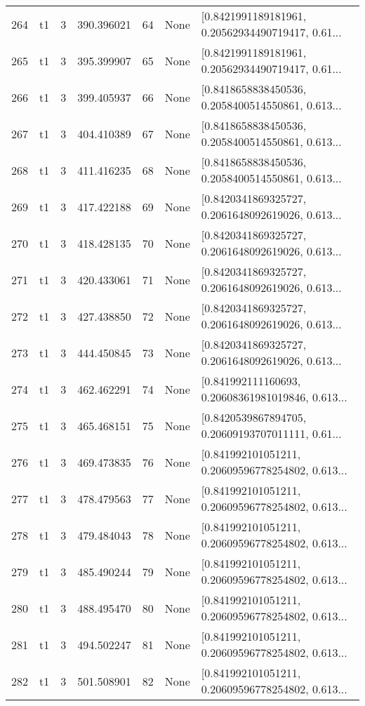 \begin{tabular}{lllrlll}
264 &  t1 &   3 &  390.396021 &   64 &  None &  [0.8421991189181961, 0.20562934490719417, 0.61... \\
265 &  t1 &   3 &  395.399907 &   65 &  None &  [0.8421991189181961, 0.20562934490719417, 0.61... \\
266 &  t1 &   3 &  399.405937 &   66 &  None &  [0.8418658838450536, 0.2058400514550861, 0.613... \\
267 &  t1 &   3 &  404.410389 &   67 &  None &  [0.8418658838450536, 0.2058400514550861, 0.613... \\
268 &  t1 &   3 &  411.416235 &   68 &  None &  [0.8418658838450536, 0.2058400514550861, 0.613... \\
269 &  t1 &   3 &  417.422188 &   69 &  None &  [0.8420341869325727, 0.2061648092619026, 0.613... \\
270 &  t1 &   3 &  418.428135 &   70 &  None &  [0.8420341869325727, 0.2061648092619026, 0.613... \\
271 &  t1 &   3 &  420.433061 &   71 &  None &  [0.8420341869325727, 0.2061648092619026, 0.613... \\
272 &  t1 &   3 &  427.438850 &   72 &  None &  [0.8420341869325727, 0.2061648092619026, 0.613... \\
273 &  t1 &   3 &  444.450845 &   73 &  None &  [0.8420341869325727, 0.2061648092619026, 0.613... \\
274 &  t1 &   3 &  462.462291 &   74 &  None &  [0.841992111160693, 0.20608361981019846, 0.613... \\
275 &  t1 &   3 &  465.468151 &   75 &  None &  [0.8420539867894705, 0.20609193707011111, 0.61... \\
276 &  t1 &   3 &  469.473835 &   76 &  None &  [0.841992101051211, 0.20609596778254802, 0.613... \\
277 &  t1 &   3 &  478.479563 &   77 &  None &  [0.841992101051211, 0.20609596778254802, 0.613... \\
278 &  t1 &   3 &  479.484043 &   78 &  None &  [0.841992101051211, 0.20609596778254802, 0.613... \\
279 &  t1 &   3 &  485.490244 &   79 &  None &  [0.841992101051211, 0.20609596778254802, 0.613... \\
280 &  t1 &   3 &  488.495470 &   80 &  None &  [0.841992101051211, 0.20609596778254802, 0.613... \\
281 &  t1 &   3 &  494.502247 &   81 &  None &  [0.841992101051211, 0.20609596778254802, 0.613... \\
282 &  t1 &   3 &  501.508901 &   82 &  None &  [0.841992101051211, 0.20609596778254802, 0.613... \\

\end{tabular}
